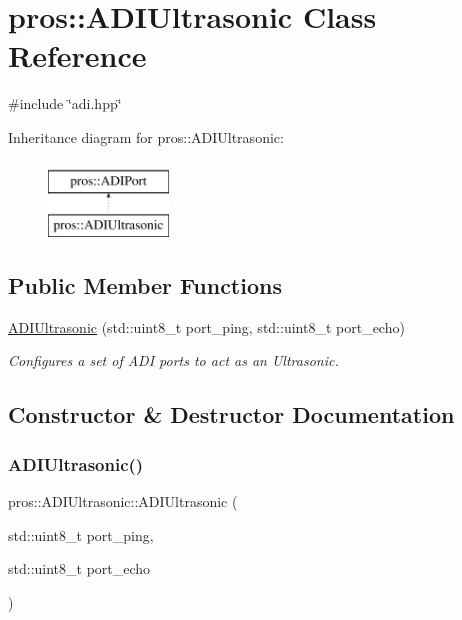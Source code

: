 \hypertarget{classpros_1_1ADIUltrasonic}{}\section{pros\+:\+:A\+D\+I\+Ultrasonic Class Reference}
\label{classpros_1_1ADIUltrasonic}


{\ttfamily \#include \char`\"{}adi.\+hpp\char`\"{}}

Inheritance diagram for pros\+:\+:A\+D\+I\+Ultrasonic\+:\begin{figure}[H]
\begin{center}
\leavevmode
\includegraphics[height=2.000000cm]{classpros_1_1ADIUltrasonic}
\end{center}
\end{figure}
\subsection*{Public Member Functions}
\begin{DoxyCompactItemize}
\item 
\hyperlink{classpros_1_1ADIUltrasonic_ae2b4cd186556af9602cc0017d324494b}{A\+D\+I\+Ultrasonic} (std\+::uint8\+\_\+t port\+\_\+ping, std\+::uint8\+\_\+t port\+\_\+echo)
\begin{DoxyCompactList}\small\item\em Configures a set of A\+DI ports to act as an Ultrasonic. \end{DoxyCompactList}\end{DoxyCompactItemize}


\subsection{Constructor \& Destructor Documentation}
\mbox{\label{classpros_1_1ADIUltrasonic_ae2b4cd186556af9602cc0017d324494b}} 
\subsubsection{\texorpdfstring{A\+D\+I\+Ultrasonic()}{ADIUltrasonic()}}
{\footnotesize\ttfamily pros\+::\+A\+D\+I\+Ultrasonic\+::\+A\+D\+I\+Ultrasonic (\begin{DoxyParamCaption}\item[{std\+::uint8\+\_\+t}]{port\+\_\+ping,  }\item[{std\+::uint8\+\_\+t}]{port\+\_\+echo }\end{DoxyParamCaption})}



